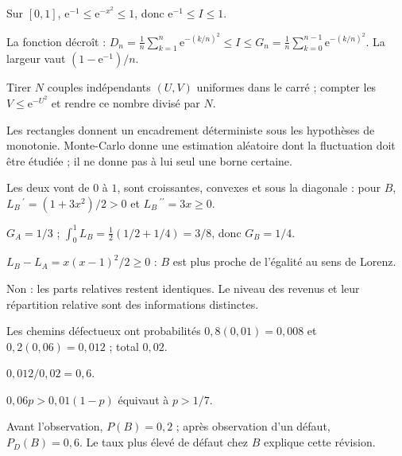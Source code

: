 \par\addvspace{6mm}\label{projet-cor-4}
\begin{questions}
\item Sur $[0,1]$, $\mathrm e^{-1}\leq\mathrm e^{-x^2}\leq1$, donc $\mathrm e^{-1}\leq I\leq1$.
\item La fonction décroît : $D_n=\frac1n\sum_{k=1}^n\mathrm e^{-(k/n)^2}\leq I\leq G_n=\frac1n\sum_{k=0}^{n-1}\mathrm e^{-(k/n)^2}$. La largeur vaut $(1-\mathrm e^{-1})/n$.
\item Tirer $N$ couples indépendants $(U,V)$ uniformes dans le carré ; compter les $V\leq\mathrm e^{-U^2}$ et rendre ce nombre divisé par $N$.
\item Les rectangles donnent un encadrement déterministe sous les hypothèses de monotonie. Monte-Carlo donne une estimation aléatoire dont la fluctuation doit être étudiée ; il ne donne pas à lui seul une borne certaine.
\end{questions}
\par\addvspace{6mm}\label{projet-cor-5}
\begin{questions}
\item Les deux vont de $0$ à $1$, sont croissantes, convexes et sous la diagonale : pour $B$, $L_B\,\!^{\prime}=(1+3x^2)/2>0$ et $L_B\,\!^{\prime\prime}=3x\geq0$.
\item $G_A=1/3$ ; $\int_0^1L_B=\tfrac12(1/2+1/4)=3/8$, donc $G_B=1/4$.
\item $L_B-L_A=x(x-1)^2/2\geq0$ : $B$ est plus proche de l’égalité au sens de Lorenz.
\item Non : les parts relatives restent identiques. Le niveau des revenus et leur répartition relative sont des informations distinctes.
\end{questions}
\par\addvspace{6mm}\label{projet-cor-6}
\begin{questions}
\item Les chemins défectueux ont probabilités $0{,}8(0{,}01)=0{,}008$ et $0{,}2(0{,}06)=0{,}012$ ; total $0{,}02$.
\item $0{,}012/0{,}02=0{,}6$.
\item $0{,}06p>0{,}01(1-p)$ équivaut à $p>1/7$.
\item Avant l’observation, $P(B)=0{,}2$ ; après observation d’un défaut, $P_D(B)=0{,}6$. Le taux plus élevé de défaut chez $B$ explique cette révision.
\end{questions}
